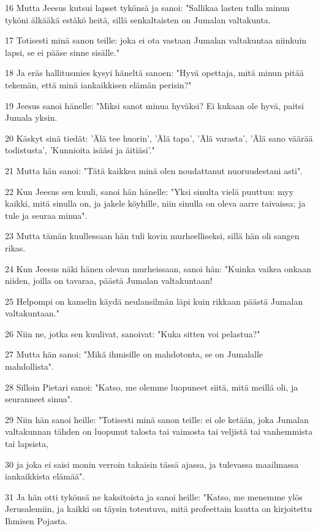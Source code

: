 \par 16 Mutta Jeesus kutsui lapset tykönsä ja sanoi: "Sallikaa lasten tulla minun tyköni älkääkä estäkö heitä, sillä senkaltaisten on Jumalan valtakunta.
\par 17 Totisesti minä sanon teille: joka ei ota vastaan Jumalan valtakuntaa niinkuin lapsi, se ei pääse sinne sisälle."
\par 18 Ja eräs hallitusmies kysyi häneltä sanoen: "Hyvä opettaja, mitä minun pitää tekemän, että minä iankaikkisen elämän perisin?"
\par 19 Jeesus sanoi hänelle: "Miksi sanot minua hyväksi? Ei kukaan ole hyvä, paitsi Jumala yksin.
\par 20 Käskyt sinä tiedät: 'Älä tee huorin', 'Älä tapa', 'Älä varasta', 'Älä sano väärää todistusta', 'Kunnioita isääsi ja äitiäsi'."
\par 21 Mutta hän sanoi: "Tätä kaikkea minä olen noudattanut nuoruudestani asti".
\par 22 Kun Jeesus sen kuuli, sanoi hän hänelle: "Yksi sinulta vielä puuttuu: myy kaikki, mitä sinulla on, ja jakele köyhille, niin sinulla on oleva aarre taivaissa; ja tule ja seuraa minua".
\par 23 Mutta tämän kuullessaan hän tuli kovin murheelliseksi, sillä hän oli sangen rikas.
\par 24 Kun Jeesus näki hänen olevan murheissaan, sanoi hän: "Kuinka vaikea onkaan niiden, joilla on tavaraa, päästä Jumalan valtakuntaan!
\par 25 Helpompi on kamelin käydä neulansilmän läpi kuin rikkaan päästä Jumalan valtakuntaan."
\par 26 Niin ne, jotka sen kuulivat, sanoivat: "Kuka sitten voi pelastua?"
\par 27 Mutta hän sanoi: "Mikä ihmisille on mahdotonta, se on Jumalalle mahdollista".
\par 28 Silloin Pietari sanoi: "Katso, me olemme luopuneet siitä, mitä meillä oli, ja seuranneet sinua".
\par 29 Niin hän sanoi heille: "Totisesti minä sanon teille: ei ole ketään, joka Jumalan valtakunnan tähden on luopunut talosta tai vaimosta tai veljistä tai vanhemmista tai lapsista,
\par 30 ja joka ei saisi monin verroin takaisin tässä ajassa, ja tulevassa maailmassa iankaikkista elämää".
\par 31 Ja hän otti tykönsä ne kaksitoista ja sanoi heille: "Katso, me menemme ylös Jerusalemiin, ja kaikki on täysin toteutuva, mitä profeettain kautta on kirjoitettu Ihmisen Pojasta.
